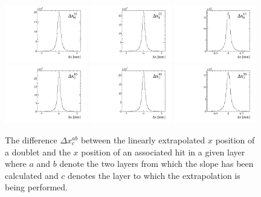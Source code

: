 \begin{figure}[!tb]
\centering
\includegraphics[width=0.32\textwidth]{figs/upstream-tracking-upgrade/dx0.pdf}
\includegraphics[width=0.32\textwidth]{figs/upstream-tracking-upgrade/dx1.pdf}
\includegraphics[width=0.32\textwidth]{figs/upstream-tracking-upgrade/dx0b.pdf}
\includegraphics[width=0.32\textwidth]{figs/upstream-tracking-upgrade/dx2.pdf}
\includegraphics[width=0.32\textwidth]{figs/upstream-tracking-upgrade/dx3.pdf}
\includegraphics[width=0.32\textwidth]{figs/upstream-tracking-upgrade/dx3b.pdf}
\caption{The difference $\Delta x_{c}^{ab}$ between the linearly extrapolated $x$ position of a doublet and the $x$ position of an associated hit in a given layer where $a$ and $b$ denote the two layers from which the slope has been calculated and $c$ denotes the layer to which the extrapolation is being performed.}
\label{fig:clustering_tolerance}
\end{figure}


